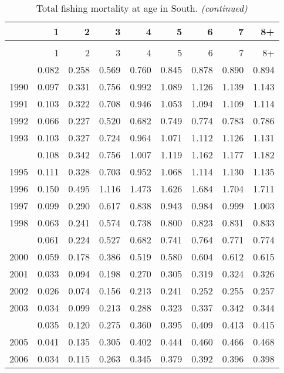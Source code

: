 \documentclass[
]{article}
\begin{document}
\begin{longtable}[t]{lrrrrrrrr}
\caption{\label{tab:South-region-FAA-table}Total fishing mortality at age in South.}\\
\toprule
  & 1 & 2 & 3 & 4 & 5 & 6 & 7 & 8+\\
\midrule
\endfirsthead
\caption[]{Total fishing mortality at age in South. \textit{(continued)}}\\
\toprule
  & 1 & 2 & 3 & 4 & 5 & 6 & 7 & 8+\\
\midrule
\endhead

\endfoot
\bottomrule
\endlastfoot
1989 & 0.082 & 0.258 & 0.569 & 0.760 & 0.845 & 0.878 & 0.890 & 0.894\\
1990 & 0.097 & 0.331 & 0.756 & 0.992 & 1.089 & 1.126 & 1.139 & 1.143\\
1991 & 0.103 & 0.322 & 0.708 & 0.946 & 1.053 & 1.094 & 1.109 & 1.114\\
1992 & 0.066 & 0.227 & 0.520 & 0.682 & 0.749 & 0.774 & 0.783 & 0.786\\
1993 & 0.103 & 0.327 & 0.724 & 0.964 & 1.071 & 1.112 & 1.126 & 1.131\\
\addlinespace
1994 & 0.108 & 0.342 & 0.756 & 1.007 & 1.119 & 1.162 & 1.177 & 1.182\\
1995 & 0.111 & 0.328 & 0.703 & 0.952 & 1.068 & 1.114 & 1.130 & 1.135\\
1996 & 0.150 & 0.495 & 1.116 & 1.473 & 1.626 & 1.684 & 1.704 & 1.711\\
1997 & 0.099 & 0.290 & 0.617 & 0.838 & 0.943 & 0.984 & 0.999 & 1.003\\
1998 & 0.063 & 0.241 & 0.574 & 0.738 & 0.800 & 0.823 & 0.831 & 0.833\\
\addlinespace
1999 & 0.061 & 0.224 & 0.527 & 0.682 & 0.741 & 0.764 & 0.771 & 0.774\\
2000 & 0.059 & 0.178 & 0.386 & 0.519 & 0.580 & 0.604 & 0.612 & 0.615\\
2001 & 0.033 & 0.094 & 0.198 & 0.270 & 0.305 & 0.319 & 0.324 & 0.326\\
2002 & 0.026 & 0.074 & 0.156 & 0.213 & 0.241 & 0.252 & 0.255 & 0.257\\
2003 & 0.034 & 0.099 & 0.213 & 0.288 & 0.323 & 0.337 & 0.342 & 0.344\\
\addlinespace
2004 & 0.035 & 0.120 & 0.275 & 0.360 & 0.395 & 0.409 & 0.413 & 0.415\\
2005 & 0.041 & 0.135 & 0.305 & 0.402 & 0.444 & 0.460 & 0.466 & 0.468\\
2006 & 0.034 & 0.115 & 0.263 & 0.345 & 0.379 & 0.392 & 0.396 & 0.398\\

\end{longtable}
\end{document}
